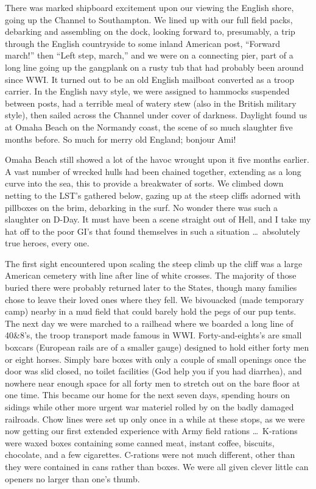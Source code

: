 \documentclass[../m3y]{subfiles}
\begin{document}
There was marked shipboard excitement upon our viewing the English shore, going up the Channel to Southampton. We lined up with our full field packs, debarking and assembling on the dock, looking forward to, presumably, a trip through the English countryside to some inland American post, ``Forward march!'' then ``Left step, march,'' and we were on a connecting pier, part of a long line going up the gangplank on a rusty tub that had probably been around since WW\thinspace{}I. It turned out to be an old English mailboat converted as a troop carrier. In the English navy style, we were assigned to hammocks suspended between posts, had a terrible meal of watery stew (also in the British military style), then sailed across the Channel under cover of darkness. Daylight found us at Omaha Beach on the Normandy coast, the scene of so much slaughter five months before. So much for merry old England; bonjour Ami!

Omaha Beach still showed a lot of the havoc wrought upon it five months earlier. A vast number of wrecked hulls had been chained together, extending as a long curve into the sea, this to provide a breakwater of sorts. We climbed down netting to the LST's gathered below, gazing up at the steep cliffs adorned with pillboxes on the brim, debarking in the surf. No wonder there was such a slaughter on D-Day. It must have been a scene straight out of Hell, and I take my hat off to the poor GI's that found themselves in such a situation \ldots\ absolutely true heroes, every one.

The first sight encountered upon scaling the steep climb up the cliff was a large American cemetery with line after line of white crosses. The majority of those buried there were probably returned later to the States, though many families chose to leave their loved ones where they fell. We bivouacked (made temporary camp) nearby in a mud field that could barely hold the pegs of our pup tents. The next day we were marched to a railhead where we boarded a long line of 40\thinspace{}\&\thinspace{}8's, the troop transport made famous in WW\thinspace{}I. Forty-and-eights's are small boxcars (European rails are of a smaller gauge) designed to hold either forty men or eight horses. Simply bare boxes with only a couple of small openings once the door was slid closed, no toilet facilities (God help you if you had diarrhea), and nowhere near enough space for all forty men to stretch out on the bare floor at one time. This became our home for the next seven days, spending hours on sidings while other more urgent war materiel rolled by on the badly damaged railroads. Chow lines were set up only once in a while at these stops, as we were now getting our first extended experience with Army field rations \ldots\ K-rations were waxed boxes containing some canned meat, instant coffee, biscuits, chocolate, and a few cigarettes. C-rations were not much different, other than they were contained in cans rather than boxes. We were all given clever little can openers no larger than one's thumb.
\end{document}
